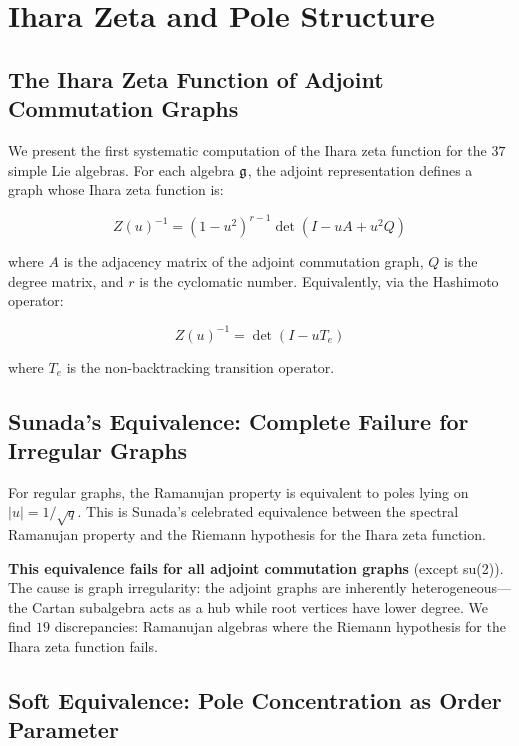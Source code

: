 \section{Ihara Zeta and Pole Structure}\label{sec:ihara_zeta}

\subsection{The Ihara Zeta Function of Adjoint Commutation Graphs}\label{sec:ihara_def}

We present the first systematic computation of the Ihara zeta function for the $37$ simple Lie algebras. For each algebra $\mathfrak{g}$, the adjoint representation defines a graph whose Ihara zeta function is:

\begin{equation}
Z(u)^{-1} = (1-u^2)^{r-1} \det(I - uA + u^2 Q)
\end{equation}

where $A$ is the adjacency matrix of the adjoint commutation graph, $Q$ is the degree matrix, and $r$ is the cyclomatic number. Equivalently, via the Hashimoto operator:

\begin{equation}
Z(u)^{-1} = \det(I - uT_e)
\end{equation}

where $T_e$ is the non-backtracking transition operator.

\subsection{Sunada's Equivalence: Complete Failure for Irregular Graphs}\label{sec:sunada_failure}

For regular graphs, the Ramanujan property is equivalent to poles lying on $|u| = 1/\sqrt{q}$. This is Sunada's celebrated equivalence between the spectral Ramanujan property and the Riemann hypothesis for the Ihara zeta function.

\textbf{This equivalence fails for all adjoint commutation graphs} (except su(2)). The cause is graph irregularity: the adjoint graphs are inherently heterogeneous---the Cartan subalgebra acts as a hub while root vertices have lower degree. We find $19$ discrepancies: Ramanujan algebras where the Riemann hypothesis for the Ihara zeta function fails.

\subsection{Soft Equivalence: Pole Concentration as Order Parameter}\label{sec:soft_equivalence}

